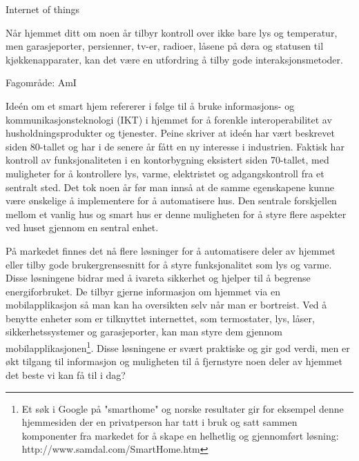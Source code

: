 {\color{blue}
Internet of things

Når hjemmet ditt om noen år tilbyr kontroll over ikke bare lys og temperatur, men garasjeporter, persienner, tv-er, radioer, låsene på døra og statusen til kjøkkenapparater, kan det være en utfordring å tilby gode interaksjonsmetoder.

Fagområde: AmI

Ideén om et smart hjem refererer i følge \citet{peine08} til å bruke informasjons- og kommunikasjonsteknologi (IKT) i hjemmet for å forenkle interoperabilitet av husholdningsprodukter og tjenester. Peine skriver at ideén har vært beskrevet siden 80-tallet og har i de senere år fått en ny interesse i industrien. Faktisk har kontroll av funksjonaliteten i en kontorbygning eksistert siden 70-tallet, med muligheter for å kontrollere lys, varme, elektristet og adgangskontroll fra et sentralt sted. Det tok noen år før man innså at de samme egenskapene kunne være ønskelige å implementere for å automatisere hus. Den sentrale forskjellen mellom et vanlig hus og smart hus er denne muligheten for å styre flere aspekter ved huset gjennom en sentral enhet.

På markedet finnes det nå flere løsninger for å automatisere deler av hjemmet eller tilby gode brukergrensesnitt for å styre funksjonalitet som lys og varme. Disse løsningene bidrar med å ivareta sikkerhet og hjelper til å begrense energiforbruket. De tilbyr gjerne informasjon om hjemmet via en mobilapplikasjon så man kan ha oversikten selv når man er bortreist. Ved å benytte enheter som er tilknyttet internettet, som termostater, lys, låser, sikkerhetssystemer og garasjeporter, kan man styre dem gjennom mobilapplikasjonen\footnote{Et søk i Google på "smarthome" og norske resultater gir for eksempel denne hjemmesiden der en privatperson har tatt i bruk og satt sammen komponenter fra markedet for å skape en helhetlig og gjennomført løsning: http://www.samdal.com/SmartHome.htm}. Disse løsningene er svært praktiske og gir god verdi, men er økt tilgang til informasjon og muligheten til å fjernstyre noen deler av hjemmet det beste vi kan få til i dag?

}

